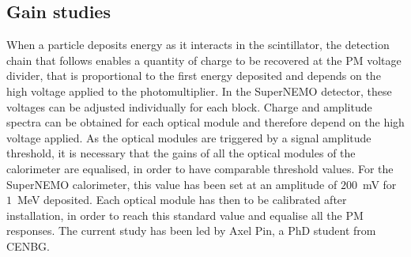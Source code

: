 \subsection{Gain studies}


When a particle deposits energy as it interacts in the scintillator, the detection chain that follows enables a quantity of charge to be recovered at the PM voltage divider, that is proportional to the first energy deposited and depends on the high voltage applied to the photomultiplier.
In the SuperNEMO detector, these voltages can be adjusted individually for each block.
Charge and amplitude spectra can be obtained for each optical module and therefore depend on the high voltage applied.
As the optical modules are triggered by a signal amplitude threshold, it is necessary that the gains of all the optical modules of the calorimeter are equalised, in order to have comparable threshold values.
For the SuperNEMO calorimeter, this value has been set at an amplitude of $200$~mV for $1$~MeV deposited.
Each optical module has then to be calibrated after installation, in order to reach this standard value and equalise all the PM responses.
The current study has been led by Axel Pin, a PhD student from CENBG.

